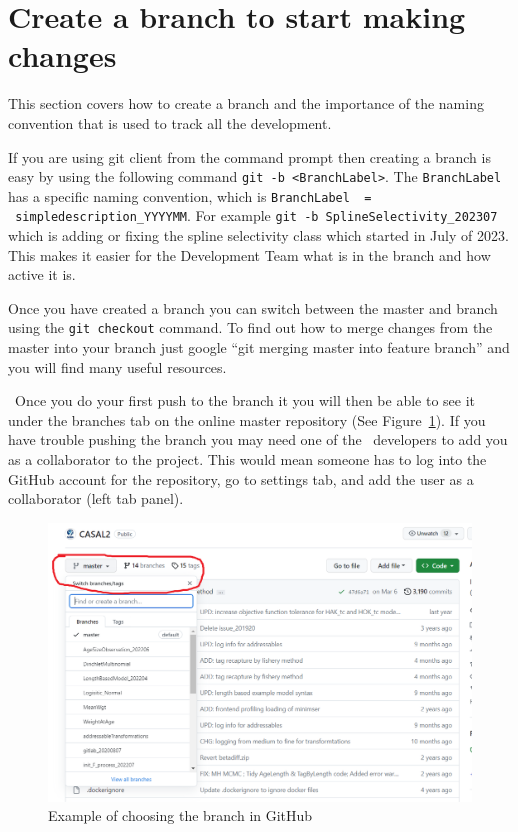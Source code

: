 \section{Create a branch to start making changes\label{sec:maintain_repo}}

This section covers how to create a branch and the importance of the naming convention that is used to track all the development. 

If you are using git client from the command prompt then creating a branch is easy by using the following command \texttt{git -b <BranchLabel>}. The \texttt{BranchLabel} has a specific naming convention, which is  \texttt{BranchLabel \ = \ simpledescription\_YYYYMM}. For example \texttt{git -b SplineSelectivity\_202307} which is adding or fixing the spline selectivity class which started in July of 2023. This makes it easier for the Development Team what is in the branch and how active it is.

Once you have created a branch you can switch between the master and branch using the \texttt{git checkout} command. To find out how to merge changes from the master into your branch just google \enquote{git merging master into feature branch} and you will find many useful resources.

\CNAME\ Once you do your first push to the branch it you will then be able to see it under the branches tab on the online master repository (See Figure~\ref{fig:branchtab}). If you have trouble pushing the branch you may need one of the \CNAME\ developers to add you as a collaborator to the project. This would mean someone has to log into the GitHub account for the repository, go to settings tab, and add the user as a collaborator (left tab panel).

\begin{figure}[!ht]
	\centering
	\includegraphics[scale=0.6]{Figures/branch_tab.png}
	\caption{Example of choosing the branch in GitHub}\label{fig:branchtab}
\end{figure}